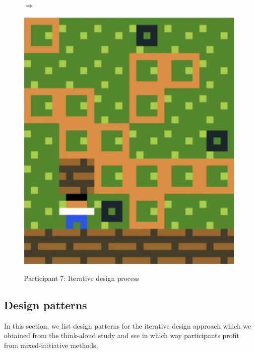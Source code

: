\begin{figure}[!htbp]
\begin{minipage}[t]{0.2\textwidth}
\end{minipage}
$\Longrightarrow$
\begin{minipage}[t]{0.2\textwidth}
\includegraphics[width=\textwidth]{figures/p8greenc.png} \hfill \\
\end{minipage}

\caption{Participant 7: Iterative design process}
\end{figure}


\subsection{Design patterns}

In this section, we list design patterns for the iterative design approach which we obtained from the think-aloud study and see in which way participants profit from mixed-initiative methods.


